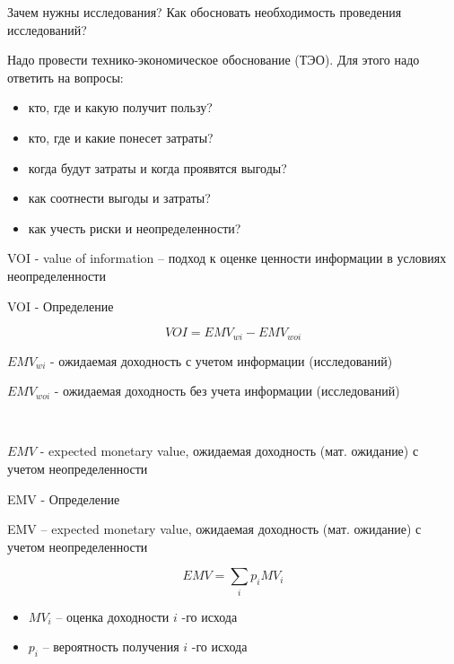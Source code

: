 \begin{frame}{Зачем нужны исследования?}
Как обосновать необходимость проведения исследований? 

Надо провести технико-экономическое обоснование (ТЭО). Для этого надо ответить на вопросы:
\begin{itemize}
    \item кто, где и какую получит пользу?
    \item кто, где и какие понесет затраты?
    \item когда будут затраты и когда проявятся выгоды?
    \item как соотнести выгоды и затраты?
    \item как учесть риски и неопределенности?
\end{itemize}
VOI - value of information -- подход к оценке ценности информации в условиях неопределенности

\end{frame}


\begin{frame}{VOI - Определение}

\begin{equation}
    VOI = EMV_{wi} - EMV_{woi}
\end{equation}


$EMV_{wi}$ - ожидаемая доходность с учетом информации (исследований)

$EMV_{woi}$ - ожидаемая доходность без учета информации (исследований)

\ 


$EMV$ - expected monetary value, ожидаемая доходность (мат. ожидание) с учетом неопределенности
\end{frame}

\begin{frame}{EMV - Определение}

EMV -- expected monetary value, ожидаемая доходность (мат. ожидание) с учетом неопределенности


\begin{equation}
    EMV = \sum_{i} p_i MV_i 
\end{equation}



\begin{itemize}
    \item $MV_i$ -- оценка доходности $i$ -го исхода

    \item $p_i$ -- вероятность получения $i$ -го исхода
\end{itemize}

\end{frame}

